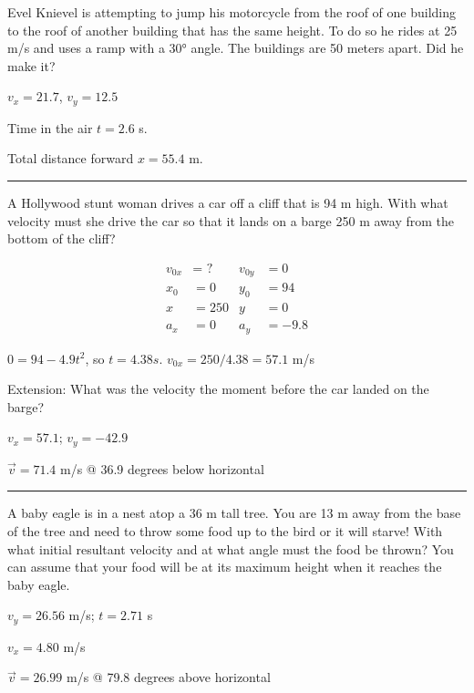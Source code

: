 \documentclass[12pt]{exam}
\begin{document}
\def\mystrut{\protect\rule[-2.2ex]{0ex}{2.2ex}} 
\qformat{ \textbf{Task \#\thequestion}
  \ifthenelse{\equal{\thequestion}{\thequestiontitle}}
    {}
    {: \emph{\thequestiontitle}}
  \mystrut  \hfill}
\begin{questions}

\Large

\question
  Evel Knievel is attempting to jump his motorcycle from the roof of one building to the roof of another building that has the same height.  To do so he rides at 25 m/s and uses a ramp with a 30° angle.  The buildings are 50 meters apart.  Did he make it?

  \begin{solution}
    $v_x=21.7$, $v_y=12.5$
    
    Time in the air $t=2.6$ s.

    Total distance forward $x=55.4$ m.
  \end{solution}
  

\vs \hrule \vs

\question

  A Hollywood stunt woman drives a car off a cliff that is 94 m high.  With what velocity must she drive the car so that it lands on a barge 250 m away from the bottom of the cliff?

  \begin{solution}
    \begin{align*}
      v_{0x} &= \text{ ?} &   v_{0y} &= 0\\
      x_0 &= 0            &   y_0 &= 94\\
      x &= 250            &   y &= 0\\
      a_x &= 0            &   a_y &= -9.8
    \end{align*}

    $0=94-4.9t^2$, so $t = 4.38 s$.  $v_{0x}=250/4.38=57.1$ m/s

    Extension: What was the velocity the moment before the car landed on the barge?

    $v_x= 57.1$; $v_y= -42.9$
    
    $\vec{v} = 71.4$ m/s @ 36.9 degrees below horizontal


  \end{solution}





  \vs \hrule \vs

\question
  A baby eagle is in a nest atop a 36 m tall tree.  You are 13 m away from the base of the tree and need to throw some food up to the bird or it will starve!  With what initial resultant velocity and at what angle must the food be thrown?  You can assume that your food will be at its maximum height when it reaches the baby eagle.

  \begin{solution}
    $v_y=26.56$ m/s; $t=2.71$ s

    $v_x=4.80$ m/s

    $\vec{v}=26.99$ m/s @ 79.8 degrees above horizontal
  \end{solution}

\end{questions}
\end{document}
